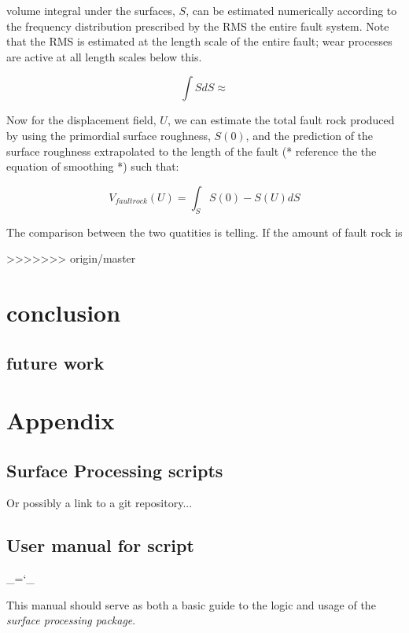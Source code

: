 \documentclass[12pt,a4paper]{article}
\begin{document}
\begin{itemize}
volume integral under the surfaces, $S$, can be estimated numerically according to the frequency distribution prescribed by the RMS the  entire fault system. Note that the RMS is estimated at the length scale of the entire fault; wear processes are active at all length scales below this.

\begin{equation}
	\int S dS \approx 
\end{equation}

Now for the displacement field, $U$, we can estimate the total fault rock produced by using the primordial surface roughness, $S(0)$, and the prediction of the surface roughness extrapolated to the length of the fault (* reference the the equation of smoothing *) such that:

\begin{equation}
	V_{fault rock}(U) = \int_S S(0)-S(U)dS
\end{equation}

The comparison between the two quatities is telling. If the amount of fault rock is

>>>>>>> origin/master
\section{conclusion}
	\subsection{future work}

\section{Appendix}

\subsection{Surface Processing scripts}

Or possibly a link to a git repository...

\subsection{User manual for script}

\chardef\_=`_

This manual should serve as both a basic guide to the logic and usage of the \textit{surface processing package}. 


\end{itemize}
\end{document}
